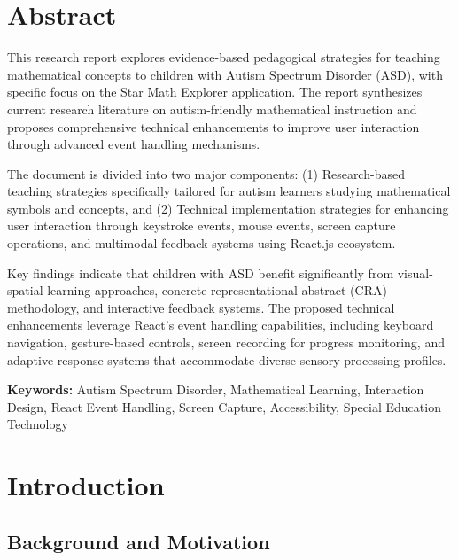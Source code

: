 \documentclass[12pt, a4paper]{article}
\begin{document}
\tableofcontents
\newpage

\section*{Abstract}

This research report explores evidence-based pedagogical strategies for teaching mathematical concepts to children with Autism Spectrum Disorder (ASD), with specific focus on the Star Math Explorer application. The report synthesizes current research literature on autism-friendly mathematical instruction and proposes comprehensive technical enhancements to improve user interaction through advanced event handling mechanisms.

The document is divided into two major components: (1) Research-based teaching strategies specifically tailored for autism learners studying mathematical symbols and concepts, and (2) Technical implementation strategies for enhancing user interaction through keystroke events, mouse events, screen capture operations, and multimodal feedback systems using React.js ecosystem.

Key findings indicate that children with ASD benefit significantly from visual-spatial learning approaches, concrete-representational-abstract (CRA) methodology, and interactive feedback systems. The proposed technical enhancements leverage React's event handling capabilities, including keyboard navigation, gesture-based controls, screen recording for progress monitoring, and adaptive response systems that accommodate diverse sensory processing profiles.

\textbf{Keywords:} Autism Spectrum Disorder, Mathematical Learning, Interaction Design, React Event Handling, Screen Capture, Accessibility, Special Education Technology

\newpage

\section{Introduction}

\subsection{Background and Motivation}
\end{document}
